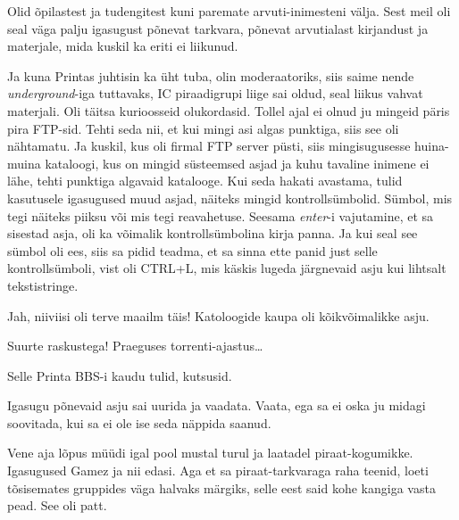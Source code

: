 
Olid õpilastest ja tudengitest kuni paremate arvuti-inimesteni välja. Sest meil oli seal väga palju igasugust põnevat tarkvara, põnevat arvutialast kirjandust ja materjale, mida kuskil ka eriti ei liikunud. 

Ja kuna Printas juhtisin ka üht tuba, olin moderaatoriks,  siis saime nende \emph{underground}-iga  tuttavaks, IC piraadigrupi liige sai oldud, seal liikus vahvat materjali. Oli täitsa kurioosseid olukordasid. Tollel ajal ei olnud ju mingeid päris pira FTP-sid. Tehti seda nii, et kui mingi asi algas punktiga, siis see oli nähtamatu. Ja kuskil, kus oli firmal FTP server püsti, siis mingisugusesse huina-muina kataloogi, kus on mingid süsteemsed asjad ja kuhu tavaline inimene ei lähe, tehti punktiga algavaid katalooge. Kui seda hakati avastama, tulid kasutusele igasugused muud asjad, näiteks mingid kontrollsümbolid. Sümbol, mis tegi näiteks piiksu või mis tegi reavahetuse. Seesama \emph{enter}-i vajutamine, et sa sisestad asja, oli ka võimalik kontrollsümbolina kirja panna. Ja kui seal see sümbol oli ees, siis sa pidid teadma, et sa sinna ette panid just selle kontrollsümboli, vist oli CTRL+L, mis käskis lugeda järgnevaid asju kui lihtsalt tekstistringe.

                 
Jah, niiviisi oli terve maailm täis! Katoloogide kaupa oli kõikvõimalikke asju.
                 

Suurte raskustega! Praeguses torrenti-ajastus\ldots


Selle Printa BBS-i kaudu tulid, kutsusid.

Igasugu põnevaid asju sai uurida ja vaadata. Vaata, ega sa ei oska ju midagi soovitada, kui sa ei ole ise seda näppida saanud.

Vene aja lõpus müüdi igal pool mustal turul ja laatadel piraat-kogumikke. Igasugused Gamez ja nii edasi. Aga et sa piraat-tarkvaraga raha teenid, loeti tõsisemates gruppides väga halvaks märgiks, selle eest said kohe kangiga vasta pead. See oli patt. 


